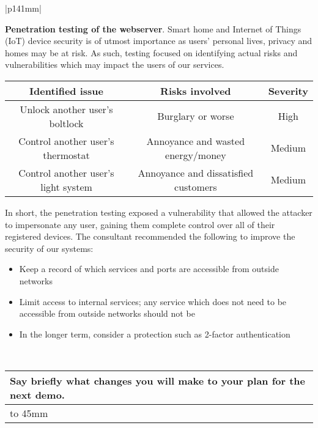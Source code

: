 \documentclass[a4paper]{article}
\newcommand{\colWidth}{141mm}
\begin{document}
\begin{center}
\begin{tabular}{|p{\colWidth}|}
{	\vspace{3mm}

	\textbf{Penetration testing of the webserver}.
	Smart home and Internet of Things (IoT) device security is of utmost importance as users' personal lives,
	privacy and homes may be at risk. As such, testing focused on identifying actual risks and vulnerabilities
	which may impact the users of our services.

	\vspace{3mm}

	\begin{tabular}{| c | c | c |} \hline
		\textbf{Identified issue} & \textbf{Risks involved} & \textbf{Severity} \\ \hline
		Unlock another user's boltlock & Burglary or worse & High \\
		Control another user's thermostat & Annoyance and wasted energy/money & Medium \\
		Control another user's light system & Annoyance and dissatisfied customers & Medium \\ \hline
	\end{tabular}

	\vspace{3mm}

	In short, the penetration testing exposed a vulnerability that allowed the attacker to impersonate
	any user, gaining them complete control over all of their registered devices. The consultant recommended
	the following to improve the security of our systems:

	\begin{itemize}
		\item Keep a record of which services and ports are accessible from outside networks
		\item Limit access to internal services; any service which does not need to be accessible from outside networks should not be
		\item In the longer term, consider a protection such as 2-factor authentication
	\end{itemize}
  }
  \\
  \hline
\end{tabular}
\vskip 5mm


\begin{tabular}{|p{\colWidth}|}
	\hline
	\cellcolor{blue!25}\large
	\textbf{Say briefly what changes you will make to your plan for the next demo.}
	\\ \hline
	\vtop to 45mm{

  }
  \\
  \hline
\end{tabular}

\end{center}
  
\end{document}
